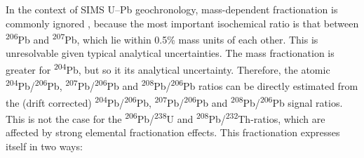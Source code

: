 \documentclass{article}
\begin{document}
In the context of SIMS U--Pb geochronology, mass-dependent
fractionation is commonly ignored \citep[but not always,
  e.g.,][]{stern2009}, because the most important isochemical ratio is
that between \textsuperscript{206}Pb and \textsuperscript{207}Pb,
which lie within 0.5\% mass units of each other. This is unresolvable
given typical analytical uncertainties. The mass fractionation is
greater for \textsuperscript{204}Pb, but so it its analytical
uncertainty.  Therefore, the atomic
\textsuperscript{204}Pb/\textsuperscript{206}Pb,
\textsuperscript{207}Pb/\textsuperscript{206}Pb and
\textsuperscript{208}Pb/\textsuperscript{206}Pb ratios can be directly
estimated from the (drift corrected)
\textsuperscript{204}Pb/\textsuperscript{206}Pb,
\textsuperscript{207}Pb/\textsuperscript{206}Pb and
\textsuperscript{208}Pb/\textsuperscript{206}Pb signal ratios.  This
is not the case for the \textsuperscript{206}Pb/\textsuperscript{238}U
and \textsuperscript{208}Pb/\textsuperscript{232}Th-ratios, which are
affected by strong elemental fractionation effects. This fractionation
expresses itself in two ways:
\end{document}
